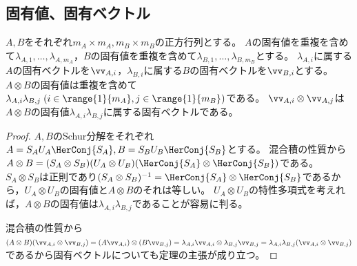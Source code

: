         \subsection{固有値、固有ベクトル}
            \label{Kronecker 積の固有値，固有ベクトル}
            \begin{shadebox}
                $A,B$をそれぞれ$m_A\times m_A, m_B\times m_B$の正方行列とする。
                $A$の固有値を重複を含めて$\lambda_{A,1},\dots,\lambda_{A,m_A}$，$B$の固有値を重複を含めて$\lambda_{B,1},\dots,\lambda_{B,m_B}$とする。
                $\lambda_{A,i}$に属する$A$の固有ベクトルを$\vv_{A,i}$，$\lambda_{B,i}$に属する$B$の固有ベクトルを$\vv_{B,i}$とする。
                $A\otimes B$の固有値は重複を含めて$\lambda_{A,i}\lambda_{B,j}\;(i\in\range{1}{m_A},j\in\range{1}{m_B})$である。
                $\vv_{A,i}\otimes\vv_{A,j}$は$A\otimes B$の固有値$\lambda_{A,i}\lambda_{B,j}$に属する固有ベクトルである。
            \end{shadebox}
            \begin{proof}
                $A,B$のSchur分解をそれぞれ$A = S_A U_A \HerConj{S_A}, B = S_B U_B \HerConj{S_B}$とする。
                混合積の性質から$A\otimes B = (S_A\otimes S_B)(U_A\otimes U_B)(\HerConj{S_A}\otimes\HerConj{S_B})$である。
                $S_A\otimes S_B$は正則であり$(S_A\otimes S_B)^{-1} = \HerConj{S_A}\otimes\HerConj{S_B}$であるから，$U_A\otimes U_B$の固有値と$A\otimes B$のそれは等しい。
                $U_A\otimes U_B$の特性多項式を考えれば，$A\otimes B$の固有値は$\lambda_{A,i}\lambda_{B,j}$であることが容易に判る。
                \par
                混合積の性質から$(A\otimes B)(\vv_{A,i}\otimes\vv_{B,j}) = (A\vv_{A,i})\otimes(B\vv_{B,j}) = \lambda_{A,i}\vv_{A,i}\otimes\lambda_{B,j}\vv_{B,j} = \lambda_{A,i}\lambda_{B,j}(\vv_{A,i}\otimes\vv_{B,j})$であるから固有ベクトルについても定理の主張が成り立つ。
            \end{proof}
